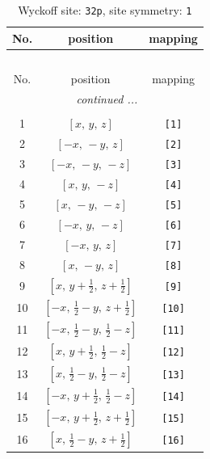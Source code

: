 \documentclass[fleqn,8pt]{jsarticle}
\begin{document}
\renewcommand{\arraystretch}{1.2}
\begin{longtable}{ccc}
\caption{Wyckoff site: {\tt 32p}, site symmetry: {\tt 1}}
 \\
 \hline \hline
No. & position & mapping \\ \hline \endfirsthead

\multicolumn{2}{l}{\tablename\ \thetable{}} \\
 \hline \hline
No. & position & mapping \\ \hline \endhead

 \hline \hline
\multicolumn{2}{r}{\footnotesize\it continued ...} \\ \endfoot

 \hline \hline
\multicolumn{2}{r}{} \\ \endlastfoot

1 & $\left[ x,\, y,\, z \right]$ & {\tt [1]} \\ \hline
2 & $\left[ - x,\, - y,\, z \right]$ & {\tt [2]} \\ \hline
3 & $\left[ - x,\, - y,\, - z \right]$ & {\tt [3]} \\ \hline
4 & $\left[ x,\, y,\, - z \right]$ & {\tt [4]} \\ \hline
5 & $\left[ x,\, - y,\, - z \right]$ & {\tt [5]} \\ \hline
6 & $\left[ - x,\, y,\, - z \right]$ & {\tt [6]} \\ \hline
7 & $\left[ - x,\, y,\, z \right]$ & {\tt [7]} \\ \hline
8 & $\left[ x,\, - y,\, z \right]$ & {\tt [8]} \\ \hline
9 & $\left[ x,\, y + \frac{1}{2},\, z + \frac{1}{2} \right]$ & {\tt [9]} \\ \hline
10 & $\left[ - x,\, \frac{1}{2} - y,\, z + \frac{1}{2} \right]$ & {\tt [10]} \\ \hline
11 & $\left[ - x,\, \frac{1}{2} - y,\, \frac{1}{2} - z \right]$ & {\tt [11]} \\ \hline
12 & $\left[ x,\, y + \frac{1}{2},\, \frac{1}{2} - z \right]$ & {\tt [12]} \\ \hline
13 & $\left[ x,\, \frac{1}{2} - y,\, \frac{1}{2} - z \right]$ & {\tt [13]} \\ \hline
14 & $\left[ - x,\, y + \frac{1}{2},\, \frac{1}{2} - z \right]$ & {\tt [14]} \\ \hline
15 & $\left[ - x,\, y + \frac{1}{2},\, z + \frac{1}{2} \right]$ & {\tt [15]} \\ \hline
16 & $\left[ x,\, \frac{1}{2} - y,\, z + \frac{1}{2} \right]$ & {\tt [16]} \\ \hline

\end{longtable}
\end{document}
